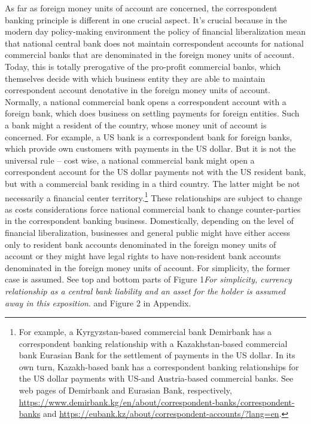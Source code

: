 As far as foreign money units of account are concerned, the
correspondent banking principle is different in one crucial aspect. It's
crucial because in the modern day policy-making environment the policy
of financial liberalization mean that national central bank does not
maintain correspondent accounts for national commercial banks that are
denominated in the foreign money units of account. Today, this is
totally prerogative of the pro-profit commercial banks, which themselves
decide with which business entity they are able to maintain
correspondent account denotative in the foreign money units of account.
Normally, a national commercial bank opens a correspondent account with
a foreign bank, which does business on settling payments for foreign
entities. Such a bank might a resident of the country, whose money unit
of account is concerned. For example, a US bank is a correspondent bank
for foreign banks, which provide own customers with payments in the US
dollar. But it is not the universal rule -- cost wise, a national
commercial bank might open a correspondent account for the US dollar
payments not with the US resident bank, but with a commercial bank
residing in a third country. The latter might be not necessarily a
financial center territory.\footnote{For example, a Kyrgyzstan-based commercial bank Demirbank has a correspondent banking relationship with a Kazakhstan-based commercial bank Eurasian Bank for the settlement of payments in the US dollar. In its own turn, Kazakh-based bank has a correspondent banking relationships for the US dollar payments with US-and Austria-based commercial banks. See web pages of Demirbank and Eurasian Bank, respectively, \url{https://www.demirbank.kg/en/about/correspondent-banks/correspondent-banks} and \url{https://eubank.kz/about/correspondent-accounts/?lang=en}.} These relationships are subject to
change as costs considerations force national commercial bank to change
counter-parties in the correspondent banking business. Domestically,
depending on the level of financial liberalization, businesses and
general public might have either access only to resident bank accounts
denominated in the foreign money units of account or they might have
legal rights to have non-resident bank accounts denominated in the
foreign money units of account. For simplicity, the former case is
assumed. See top and bottom parts of Figure 1\textit{For simplicity, currency relationship as a central bank liability and an asset for the holder is assumed away in this exposition}. and Figure 2 in Appendix.

